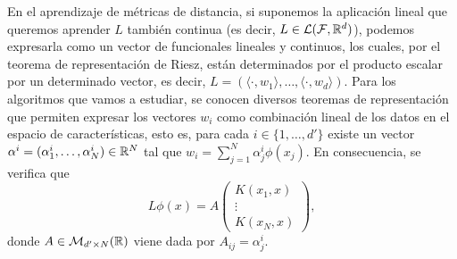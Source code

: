 En el aprendizaje de métricas de distancia, si suponemos la aplicación lineal que queremos aprender $L$ también continua (es decir, $L \in \mathcal{L}(\mathcal{F},\mathbb{R}^d)$), podemos expresarla como un vector de funcionales lineales y continuos, los cuales, por el teorema de representación de Riesz, están determinados por el producto escalar por un determinado vector, es decir, $L = (\langle \cdot, w_1 \rangle, \dots, \langle \cdot , w_d \rangle)$. Para los algoritmos que vamos a estudiar, se conocen diversos teoremas de representación \cite{neurocomputing,hofmann2008kernel,kda,dmlmj,kpca} que permiten expresar los vectores $w_i$ como combinación lineal de los datos en el espacio de características, esto es, para cada $i \in \{1,\dots,d'\}$ existe un vector $\alpha^i = (\alpha_1^i,\dots,\alpha_{N}^i) \in \mathbb{R}^{N}$ tal que $w_i = \sum_{j=1}^N \alpha_j^i \phi(x_j)$. En consecuencia, se verifica que
\[L\phi(x) = A \begin{pmatrix} K(x_1,x) \\ \vdots \\ K(x_N,x) \end{pmatrix},\]
donde $A \in \mathcal{M}_{d'\times N}(\mathbb{R})$ viene dada por $A_{ij} = \alpha_j^i$.

